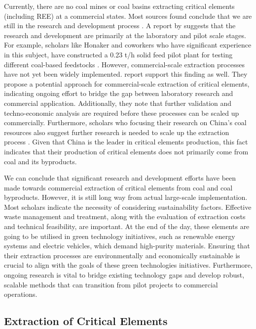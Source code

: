 \documentclass[11pt,a4paper,]{article}
\begin{document}
Currently, there are no coal mines or coal basins extracting critical elements (including REE) at a commercial states. Most sources found conclude that we are still in the research and development process \autocite{Hodgkinson2020,DAI2018155,Eterigho2021,osti_1808639,TALAN2022107897}. A report by \textcite{Eterigho2021} suggests that the research and development are primarily at the laboratory and pilot scale stages. For example, scholars like Honaker and coworkers who have significant experience in this subject, have constructed a 0.23 t/h solid feed pilot plant for testing different coal-based feedstocks \autocite{osti_1808639}. However, commercial-scale extraction processes have not yet been widely implemented. \textcite{TALAN2022107897} report support this finding as well. They propose a potential approach for commercial-scale extraction of critical elements, indicating ongoing effort to bridge the gap between laboratory research and commercial application. Additionally, they note that further validation and techno-economic analysis are required before these processes can be scaled up commercially. Furthermore, scholars who focusing their research on China's coal resources also suggest further research is needed to scale up the extraction process \autocite{Qin2015,Qin2015b,Liu2024,Zhao2019,ZOU2023105245}. Given that China is the leader in critical elements production, this fact indicates that their production of critical elements does not primarily come from coal and its byproducts.

We can conclude that significant research and development efforts have been made towards commercial extraction of critical elements from coal and coal byproducts. However, it is still long way from actual large-scale implementation. Most scholars indicate the necessity of considering sustainability factors. Effective waste management and treatment, along with the evaluation of extraction costs and technical feasibility, are important. At the end of the day, these elements are going to be utilised in green technology initiatives, such as renewable energy systems and electric vehicles, which demand high-purity materials. Ensuring that their extraction processes are environmentally and economically sustainable is crucial to align with the goals of these green technologies initiatives. Furthermore, ongoing research is vital to bridge existing technology gaps and develop robust, scalable methods that can transition from pilot projects to commercial operations.

\hypertarget{extraction-of-critical-elements}{%
\subsection{Extraction of Critical Elements}\label{extraction-of-critical-elements}}
\end{document}
